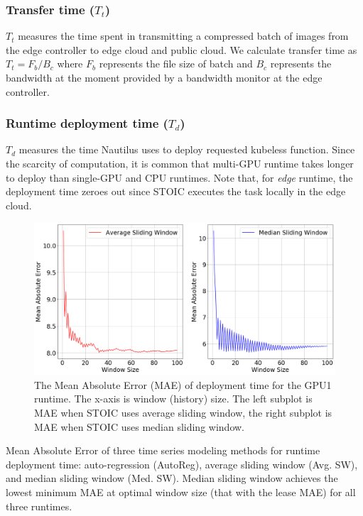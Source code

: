\subsubsection{Transfer time ($T_t$)} 

$T_t$ measures the time spent in transmitting a compressed batch of images from the edge controller to edge cloud and public cloud. We calculate transfer time as ${T_t = F_b / B_c}$ where $F_b$ represents the file size of batch and $B_c$ represents the bandwidth at the moment provided by a bandwidth monitor at the edge controller. 
 
\subsubsection{Runtime deployment time ($T_d$)} 

$T_d$ measures the time Nautilus uses to deploy requested kubeless function. Since the scarcity of computation, it is common that multi-GPU runtime takes longer to deploy than single-GPU and CPU runtimes. Note that, for \textit{edge} runtime, the deployment time zeroes out since STOIC executes the task locally in the edge cloud.
 
\begin{figure}
    \centering
    \includegraphics[scale=0.28]{figures/deployment}
    \caption{The Mean Absolute Error (MAE) of deployment time for the GPU1 runtime. The x-axis is window (history) size. The left subplot is MAE when STOIC uses average sliding window, the right subplot is MAE when STOIC uses median sliding window.
\label{fig:deployment}}
\end{figure}

 
\begin{table}
\centering

\caption{Mean Absolute Error of three time series modeling methods for runtime deployment time: auto-regression (AutoReg), average sliding window (Avg. SW), and median sliding window (Med. SW). Median sliding window achieves the lowest minimum MAE at optimal window size (that with the lease MAE) for all three runtimes. \label{tab:deployment}}
\end{table}
 

